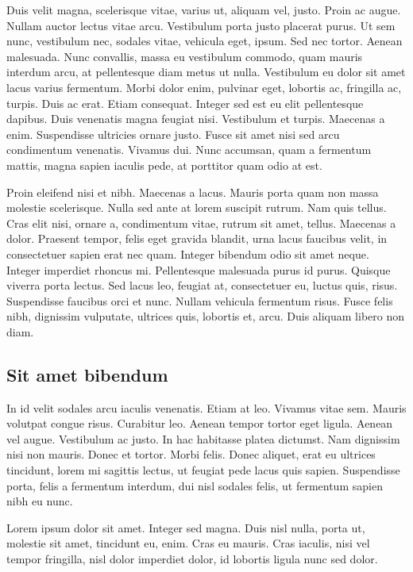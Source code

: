 \documentclass[../hdr.tex]{subfiles}
\begin{document}
Duis velit magna, scelerisque vitae, varius ut, aliquam vel, justo. Proin ac
augue. Nullam auctor lectus vitae arcu. Vestibulum porta justo placerat purus.
Ut sem nunc, vestibulum nec, sodales vitae, vehicula eget, ipsum. Sed nec
tortor. Aenean malesuada. Nunc convallis, massa eu vestibulum commodo, quam
mauris interdum arcu, at pellentesque diam metus ut nulla. Vestibulum eu dolor
sit amet lacus varius fermentum. Morbi dolor enim, pulvinar eget, lobortis ac,
fringilla ac, turpis. Duis ac erat. Etiam consequat. Integer sed est eu elit
pellentesque dapibus. Duis venenatis magna feugiat nisi. Vestibulum et turpis.
Maecenas a enim. Suspendisse ultricies ornare justo. Fusce sit amet nisi sed
arcu condimentum venenatis. Vivamus dui. Nunc accumsan, quam a fermentum mattis,
magna sapien iaculis pede, at porttitor quam odio at est.

Proin eleifend nisi et nibh. Maecenas a lacus. Mauris porta quam non massa
molestie scelerisque. Nulla sed ante at lorem suscipit rutrum. Nam quis tellus.
Cras elit nisi, ornare a, condimentum vitae, rutrum sit amet, tellus. Maecenas a
dolor. Praesent tempor, felis eget gravida blandit, urna lacus faucibus velit,
in consectetuer sapien erat nec quam. Integer bibendum odio sit amet neque.
Integer imperdiet rhoncus mi. Pellentesque malesuada purus id purus. Quisque
viverra porta lectus. Sed lacus leo, feugiat at, consectetuer eu, luctus quis,
risus. Suspendisse faucibus orci et nunc. Nullam vehicula fermentum risus. Fusce
felis nibh, dignissim vulputate, ultrices quis, lobortis et, arcu. Duis aliquam
libero non diam.

\subsection{Sit amet bibendum}

In id velit sodales arcu iaculis venenatis. Etiam at leo. Vivamus vitae sem.
Mauris volutpat congue risus. Curabitur leo. Aenean tempor tortor eget ligula.
Aenean vel augue. Vestibulum ac justo. In hac habitasse platea dictumst. Nam
dignissim nisi non mauris. Donec et tortor. Morbi felis. Donec aliquet, erat eu
ultrices tincidunt, lorem mi sagittis lectus, ut feugiat pede lacus quis sapien.
Suspendisse porta, felis a fermentum interdum, dui nisl sodales felis, ut
fermentum sapien nibh eu nunc.

Lorem ipsum dolor sit amet. Integer sed magna. Duis nisl nulla, porta ut,
molestie sit amet, tincidunt eu, enim. Cras eu mauris. Cras iaculis, nisi vel
tempor fringilla, nisl dolor imperdiet dolor, id lobortis ligula nunc sed dolor.
\end{document}
